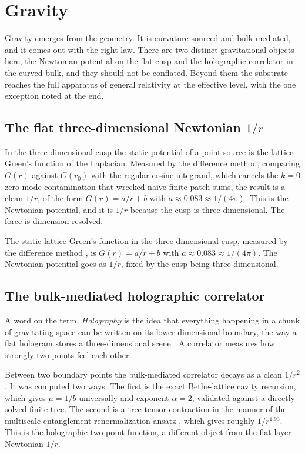 \section{Gravity}

Gravity emerges from the geometry. It is curvature-sourced and bulk-mediated, and it comes out with the right
law. There are two distinct gravitational objects here, the Newtonian potential on the flat cusp and the
holographic correlator in the curved bulk, and they should not be conflated. Beyond them the substrate reaches
the full apparatus of general relativity at the effective level, with the one exception noted at the end.

\subsection{The flat three-dimensional Newtonian $1/r$}

In the three-dimensional cusp the static potential of a point source is the lattice Green's function of the
Laplacian. Measured by the difference method, comparing $G(r)$ against $G(r_0)$ with the regular cosine
integrand, which cancels the $k = 0$ zero-mode contamination that wrecked naive finite-patch sums, the result is
a clean $1/r$, of the form $G(r) = a/r + b$ with $a \approx 0.083 \approx 1/(4\pi)$. This is the Newtonian
potential, and it is $1/r$ because the cusp is three-dimensional. The force is dimension-resolved.

\begin{result}
The static lattice Green's function in the three-dimensional cusp, measured by the difference method
\cite{pollard2026vibetest}, is $G(r) = a/r + b$ with $a \approx 0.083 \approx 1/(4\pi)$. The Newtonian potential
goes as $1/r$, fixed by the cusp being three-dimensional.
\end{result}

\subsection{The bulk-mediated holographic correlator}

A word on the term. \emph{Holography} is the idea that everything happening in a chunk of gravitating space can
be written on its lower-dimensional boundary, the way a flat hologram stores a three-dimensional scene
\cite{maldacena1998}. A correlator measures how strongly two points feel each other.

Between two boundary points the bulk-mediated correlator decays as a clean $1/r^2$. It was computed two ways. The
first is the exact Bethe-lattice cavity recursion, which gives $\mu = 1/b$ universally and exponent $\alpha = 2$,
validated against a directly-solved finite tree. The second is a tree-tensor contraction in the manner of the
multiscale entanglement renormalization ansatz \cite{ryu2006}, which gives roughly $1/r^{1.93}$. This is the
holographic two-point function, a different object from the flat-layer Newtonian $1/r$.

